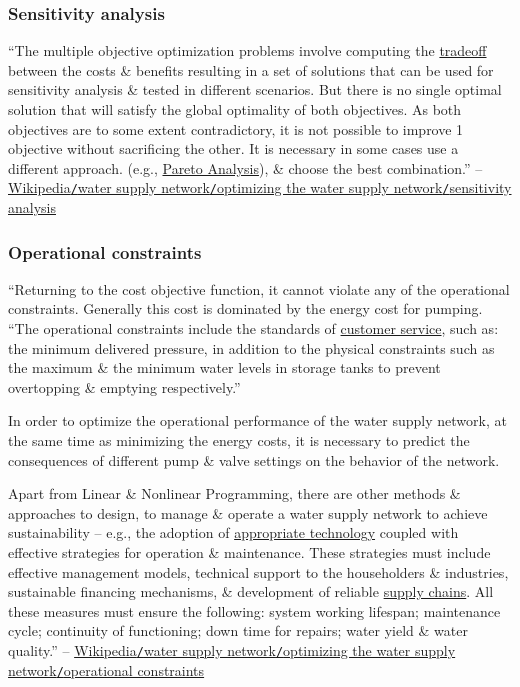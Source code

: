 \documentclass[oneside]{book}
\numberwithin{equation}{section}
\begin{document}
\subsubsection{Sensitivity analysis}
``The multiple objective optimization problems involve computing the \href{https://en.wikipedia.org/wiki/Tradeoff}{tradeoff} between the costs \& benefits resulting in a set of solutions that can be used for sensitivity analysis \& tested in different scenarios. But there is no single optimal solution that will satisfy the global optimality of both objectives. As both objectives are to some extent contradictory, it is not possible to improve 1 objective without sacrificing the other. It is necessary in some cases use a different approach. (e.g., \href{https://en.wikipedia.org/wiki/Pareto_analysis}{Pareto Analysis}), \& choose  the best combination.'' -- \href{https://en.wikipedia.org/wiki/Water_supply_network#Sensitivity_analysis}{Wikipedia\texttt{/}water supply network\texttt{/}optimizing the water supply network\texttt{/}sensitivity analysis}

\subsubsection{Operational constraints}
``Returning to the cost objective function, it cannot violate any of the operational constraints. Generally this cost is dominated by the energy cost for pumping. ``The operational constraints include the standards of \href{https://en.wikipedia.org/wiki/Customer_service}{customer service}, such as: the minimum delivered pressure, in addition to the physical constraints such as the maximum \& the minimum water levels in storage tanks to prevent overtopping \& emptying respectively.''

In order to optimize the operational performance of the water supply network, at the same time as minimizing the energy costs, it is necessary to predict the consequences of different pump \& valve settings on the behavior of the network.

Apart from Linear \& Nonlinear Programming, there are other methods \& approaches to design, to manage \& operate a water supply network to achieve sustainability -- e.g., the adoption of \href{https://en.wikipedia.org/wiki/Appropriate_technology}{appropriate technology} coupled with effective strategies for operation \& maintenance. These strategies must include effective management models, technical support to the householders \& industries, sustainable financing mechanisms, \& development of reliable \href{https://en.wikipedia.org/wiki/Supply_chain}{supply chains}. All these measures must ensure the following: system working lifespan; maintenance cycle; continuity of functioning; down time for repairs; water yield \& water quality.'' -- \href{https://en.wikipedia.org/wiki/Water_supply_network#Operational_constraints}{Wikipedia\texttt{/}water supply network\texttt{/}optimizing the water supply network\texttt{/}operational constraints}
\end{document}

